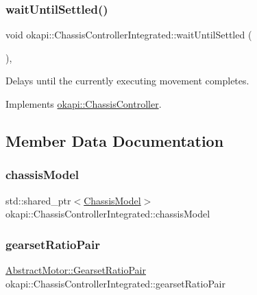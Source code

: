 \subsubsection{\texorpdfstring{waitUntilSettled()}{waitUntilSettled()}}
{\footnotesize\ttfamily void okapi\+::\+Chassis\+Controller\+Integrated\+::wait\+Until\+Settled (\begin{DoxyParamCaption}{ }\end{DoxyParamCaption})\hspace{0.3cm}{\ttfamily [override]}, {\ttfamily [virtual]}}

Delays until the currently executing movement completes. 

Implements \mbox{\hyperlink{classokapi_1_1ChassisController_a01ed4e0eb7332cc149228387bbf1e91c}{okapi\+::\+Chassis\+Controller}}.



\subsection{Member Data Documentation}
\mbox{\label{classokapi_1_1ChassisControllerIntegrated_a1bd4b6be267db5c317f4600c37044abb}} 
\subsubsection{\texorpdfstring{chassisModel}{chassisModel}}
{\footnotesize\ttfamily std\+::shared\+\_\+ptr$<$\mbox{\hyperlink{classokapi_1_1ChassisModel}{Chassis\+Model}}$>$ okapi\+::\+Chassis\+Controller\+Integrated\+::chassis\+Model\hspace{0.3cm}{\ttfamily [protected]}}

\mbox{\label{classokapi_1_1ChassisControllerIntegrated_a24178f28a3d581242235e5150618b148}} 
\subsubsection{\texorpdfstring{gearsetRatioPair}{gearsetRatioPair}}
{\footnotesize\ttfamily \mbox{\hyperlink{structokapi_1_1AbstractMotor_1_1GearsetRatioPair}{Abstract\+Motor\+::\+Gearset\+Ratio\+Pair}} okapi\+::\+Chassis\+Controller\+Integrated\+::gearset\+Ratio\+Pair\hspace{0.3cm}{\ttfamily [protected]}}


